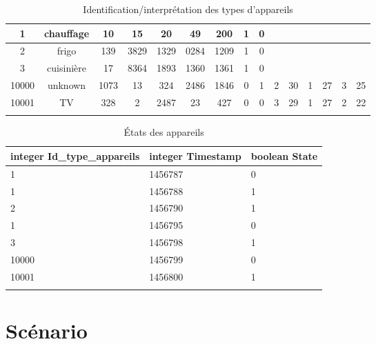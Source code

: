 \documentclass[10pt,a4paper]{article}
\begin{document}
\begin{table}[h]
{\begin{tabular}{|c|c|c|c|c|c|c|c|c|c|c|c|c|c|c|}
1 & chauffage & 10 & 15 & 20 & 49 & 200 & 1 & 0 &  &  &  &  &  &  \\ \hline
2 & frigo & 139 & 3829 & 1329 & 0284 & 1209 & 1 & 0 &  &  &  &  &  &  \\ \hline
3 & cuisinière & 17 & 8364 & 1893 & 1360 & 1361 & 1 & 0  &  &  &  &  &  &  \\ \hline
10000 & unknown & 1073 & 13 & 324 & 2486 & 1846 & 0 & 1 & 2 & 30 & 1 & 27 & 3 & 25 \\ \hline
10001 & TV & 328 & 2 & 2487 & 23 & 427 & 0 & 0 & 3 & 29 & 1 & 27 & 2 & 22 \\ \hline
 &  &  &  &  &  &  &  &  &  &  &  &  &  & 
\end{tabular}
}
\caption{Identification/interprétation des types d'appareils}
\end{table}

\begin{table}[h!]
\centering
    \begin{tabular}{|l|l|l|}
    \hline
    \rowcolor[HTML]{EFEFEF} 
    integer Id\_type\_appareils & integer Timestamp & boolean State \\ \hline
    1       & 1456787           & 0             \\ \hline
    1       & 1456788           & 1             \\ \hline
    2       & 1456790           & 1             \\ \hline
    1       & 1456795           & 0             \\ \hline
    3       & 1456798           & 1             \\ \hline
    10000       & 1456799          & 0             \\ \hline
    10001       & 1456800           & 1             \\ \hline
                 &                   &              
    \end{tabular}
    \caption{États des appareils}
\end{table} 
\newpage
\section{Scénario}
\end{document}
